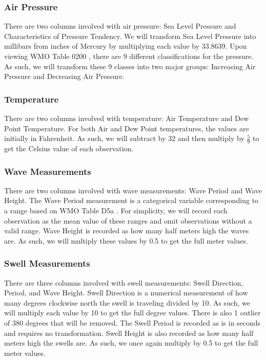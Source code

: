 \documentclass{article}
\begin{document}
\subsubsection*{Air Pressure}

There are two columns involved with air pressure: Sea Level Pressure and Characteristics of Pressure Tendency. We will transform Sea Level Pressure into millibars from inches of Mercury by multiplying each value by 33.8639. Upon viewing WMO Table 0200 \cite{WMOCodes2017}, there are 9 different classifications for the pressure. As such, we will transform these 9 classes into two major groups: Increasing Air Pressure and Decreasing Air Pressure.

\subsubsection*{Temperature}

There are two columns involved with temperature: Air Temperature and Dew Point Temperature. For both Air and Dew Point temperatures, the values are initially in Fahrenheit. As such, we will subtract by 32 and then multiply by $\frac{5}{9}$ to get the Celsius value of each observation.

\subsubsection*{Wave Measurements}

There are two columns involved with wave measurements: Wave Period and Wave Height. The Wave Period measurement is a categorical variable corresponding to a range based on WMO Table D5a \cite{WMOCodes2017}. For simplicity, we will record each observation as the mean value of these ranges and omit observations without a valid range. Wave Height is recorded as how many half meters high the waves are. As such, we will multiply these values by 0.5 to get the full meter values.

\subsubsection*{Swell Measurements}

There are three columns involved with swell measurements: Swell Direction, Period, and Wave Height. Swell Direction is a numerical measurement of how many degrees clockwise north the swell is traveling divided by 10. As such, we will multiply each value by 10 to get the full degree values. There is also 1 outlier of 380 degrees that will be removed. The Swell Period is recorded as is in seconds and requires no transformation. Swell Height is also recorded as how many half meters high the swells are. As such, we once again multiply by 0.5 to get the full meter values.
\end{document}
